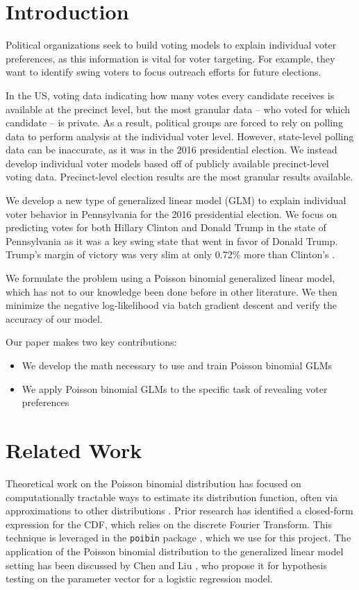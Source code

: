 \documentclass[10pt, letterpaper]{article}
\begin{document}
\begin{multicols}{2}

\section{Introduction}
Political organizations seek to build voting models to explain individual voter preferences, as this information is vital for voter targeting. For example, they want to identify swing voters to focus outreach efforts for future elections.

In the US, voting data indicating how many votes every candidate receives is available at the precinct level, but the most granular data -- who voted for which candidate -- is private. As a result, political groups are forced to rely on polling data to perform analysis at the individual voter level. However, state-level polling data can be inaccurate, as it was in the 2016 presidential election. We instead develop individual voter models based off of publicly available precinct-level voting data. Precinct-level election results are the most granular results available.

We develop a new type of generalized linear model (GLM) to explain individual voter behavior in Pennsylvania for the 2016 presidential election. We focus on predicting votes for both Hillary Clinton and Donald Trump in the state of Pennsylvania as it was a key swing state that went in favor of Donald Trump. Trump's margin of victory was very slim at only 0.72\% more than Clinton's \cite{NYT}. 

We formulate the problem using a Poisson binomial generalized linear model, which has not to our knowledge been done before in other literature. We then minimize the negative log-likelihood via batch gradient descent and verify the accuracy of our model.

Our paper makes two key contributions:
\begin{itemize}[noitemsep]
	\item We develop the math necessary to use and train Poisson binomial GLMs
	\item We apply Poisson binomial GLMs to the specific task of revealing voter preferences
\end{itemize}

\section{Related Work}
Theoretical work on the Poisson binomial distribution has focused on computationally tractable ways to estimate its distribution function, often via approximations to other distributions 
\cite{EHM19917, roos1999, chen1974}. Prior research \cite{HONG201341} has identified a closed-form expression for the CDF, which relies on the discrete Fourier Transform. This technique is leveraged in the \texttt{poibin} package \cite{PoibiGithub}, which we use for this project. The application of the Poisson binomial distribution to the generalized linear model setting has been discussed by Chen and Liu \cite{Poibi}, who propose it for hypothesis testing on the parameter vector for a logistic regression model. 


\end{multicols}
\end{document}
